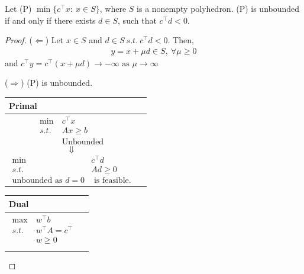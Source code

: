\documentclass[11pt]{article}
\numberwithin{equation}{section}
\begin{document}
\begin{theorem}
    Let (P) $\min \{ c^\top x: \ x \in S \}$, where $S$ is a nonempty polyhedron. (P) is unbounded if and only if there exists $d \in S$, such that $c^\top d <0$.
    \begin{proof}
        ($\Longleftarrow$) Let $x \in S$ and $d \in S \ s.t.\ c^\top d < 0$. Then, \begin{align*}
            y=x + \mu d \in S, \ \forall\mu \geq 0
        \end{align*}
        and $c^\top y=c^\top (x+\mu d) \rightarrow -\infty \text{ as }\mu \rightarrow \infty$

        ($\Longrightarrow$) (P) is unbounded.

        \begin{minipage}[t]{.5\linewidth}
            \vspace{0pt}
            \centering
            \begin{tabular}{ll}
                Primal \\ \hline
                \parbox{5cm}{
                    \begin{align*}
                    \min \ & c^\top x \\
                        s.t. \ & Ax\geq b \\
                        &\text{Unbounded}
                \end{align*}
                $$\Downarrow$$
                \begin{align*}
                    \min \ & c^\top d \\
                        s.t. \ & Ad \geq 0 \\
                        \text{unbounded as } d=0 & \text{ is feasible.}
                \end{align*}
                }
            \end{tabular}
        \end{minipage}%
        \begin{minipage}[t]{.5\linewidth}
            \vspace{0pt}
            \centering
            \begin{tabular}{ll}
                Dual \\ \hline
                \parbox{5cm}{
                    \begin{align*}
                    \max \ & w^\top b \\
                        s.t. \ & w^\top A = c^\top  \\
                        & w \geq 0 \\

\end{align*}}
\end{tabular}
\end{minipage}
\end{proof}
\end{theorem}
\end{document}

